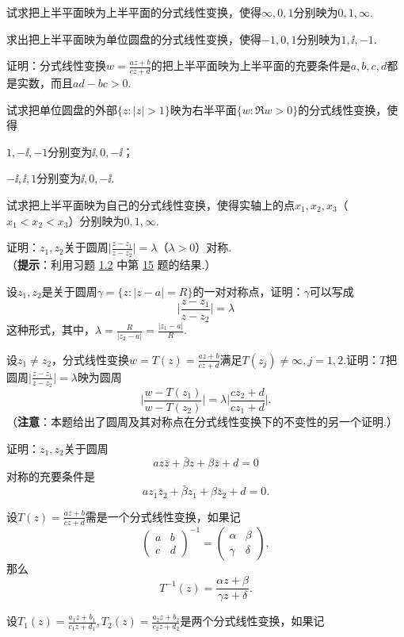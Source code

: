 \begin{xiti}
\item 试求把上半平面映为上半平面的分式线性变换，使得$\infty,0,1$分别映为$0,1,\infty$.
\item 求出把上半平面映为单位圆盘的分式线性变换，使得$-1,0,1$分别映为$1,\ii,-1$.
\item 证明：分式线性变换$w=\frac{az+b}{cz+d}$的把上半平面映为上半平面的充要条件是$a,b,c,d$都是实数，而且$ad-bc>0$.
\item 试求把单位圆盘的外部$\{z:|z|>1\}$映为右半平面$\{w:\Re w>0\}$的分式线性变换，使得
\begin{enuma}
  \item $1,-\ii,-1$分别变为$\ii,0,-\ii$；
  \item $-\ii,\ii,1$分别变为$\ii,0,-\ii$.
\end{enuma}
\item 试求把上半平面映为自己的分式线性变换，使得实轴上的点$x_1,x_2,x_3$（$x_1<x_2<x_3$）分别映为$0,1,\infty$.
\item 证明：$z_1,z_2$关于圆周$\bigg|\frac{z-z_1}{z-z_2}\bigg|=\lambda$（$\lambda>0$）对称.\\
（\textbf{提示}：利用习题 \hyperlink{xiti1.2}{1.2} 中第 \hyperlink{xiti1.2.15}{15} 题的结果.）
\item 设$z_1,z_2$是关于圆周$\gamma=\{z:|z-a|=R\}$的一对对称点，证明：$\gamma$可以写成
\[\bigg|\frac{z-z_1}{z-z_2}\bigg|=\lambda\]
这种形式，其中，$\lambda=\frac R{|z_2-a|}=\frac{|z_1-a|}R$.
\item 设$z_1\ne z_2$，分式线性变换$w=T(z)=\frac{az+b}{cz+d}$满足$T(z_j)\ne\infty,j=1,2$.证明：$T$把圆周$\bigg|\frac{z-z_1}{z-z_2}\bigg|=\lambda$映为圆周
    \[\bigg|\frac{w-T(z_1)}{w-T(z_2)}\bigg|=\lambda\bigg|\frac{cz_2+d}{cz_1+d}\bigg|.\]
（\textbf{注意}：本题给出了圆周及其对称点在分式线性变换下的不变性的另一个证明.）
\item 证明：$z_1,z_2$关于圆周
\[az\bar z+\bar \beta z+\beta\bar z+d=0\]
对称的充要条件是
\[az_1\bar z_2+\bar \beta z_1+\beta\bar z_2+d=0.\]
\item 设$T(z)=\frac{az+b}{cz+d}$需是一个分式线性变换，如果记
\[\begin{pmatrix}
a&b\\c&d
\end{pmatrix}^{-1}=\begin{pmatrix}
\alpha&\beta\\\gamma&\delta
\end{pmatrix},\]
那么
\[T^{-1}(z)=\frac{\alpha z+\beta}{\gamma z+\delta}.\]
\item 设$T_1(z)=\frac{a_1z+b_1}{c_1z+d_1},T_2(z)=\frac{a_2z+b_2}{c_2z+d_2}$是两个分式线性变换，如果记

\end{xiti}
